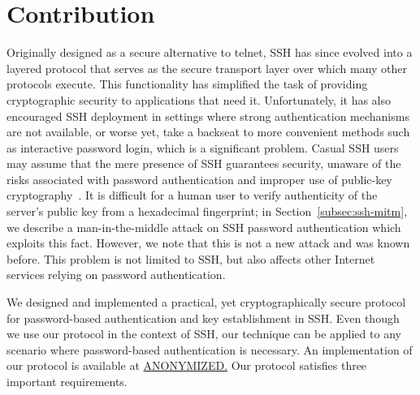 \section{Contribution}
\label{sec:ssh-intro}


Originally designed as a secure alternative to telnet, SSH has since
evolved into a layered protocol that serves as the secure transport
layer over which many other protocols execute.  This functionality has
simplified the task of providing cryptographic security to
applications that need it.  Unfortunately, it has also encouraged SSH
deployment in settings where strong authentication mechanisms are not
available, or worse yet, take a backseat to more convenient methods
such as interactive password login, which is a significant problem.
Casual SSH users may assume that the mere presence of SSH guarantees
security, unaware of the risks associated with password authentication
and improper use of public-key
cryptography~\cite{DBLP:journals/compsec/YangS99}.  It is difficult
for a human user to verify authenticity of the server's public key
from a hexadecimal fingerprint; in Section~\ref{subsec:ssh-mitm}, we
describe a man-in-the-middle attack on SSH password authentication
which exploits this fact.  However, we note that this is not a new
attack and was known before. This problem is not limited to SSH, but
also affects other Internet services relying on password
authentication.

\vspace{1ex}
\noindent
We designed and implemented a practical, yet cryptographically secure
protocol for password-based authentication and key establishment in SSH.
Even though we use our protocol in the context of SSH, our technique
can be applied to any scenario where password-based authentication
is necessary.  An implementation of our protocol is available at
\url{ANONYMIZED.}
Our protocol satisfies three important requirements.

